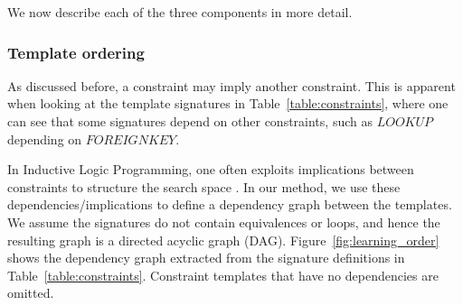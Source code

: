 \documentclass{sig-alternate-05-2015}
\newcommand{\CSignature}{Signature\xspace}
\newcommand{\CFunction}{Definition\xspace}
\newcommand{\groups}{\ensuremath{\mathcal{G}}\xspace}
\begin{document}


We now describe each of the three components in more detail.

\subsubsection{Template ordering}
As discussed before, a constraint may imply another constraint. This is apparent when looking at the template signatures in Table~\ref{table:constraints}, where one can see that some signatures depend on other constraints, such as $LOOKUP$ depending on $FOREIGNKEY$.

In Inductive Logic Programming, one often exploits implications between constraints to structure the search space \cite{luc_book}.
In our method, we use these dependencies/implications to define a dependency graph between the templates. We assume the signatures do not contain equivalences or loops, and hence the resulting graph is a directed acyclic graph (DAG).
Figure~\ref{fig:learning_order} shows the dependency graph extracted from the signature definitions in Table~\ref{table:constraints}. 
Constraint templates that have no dependencies are omitted. 
\end{document}
